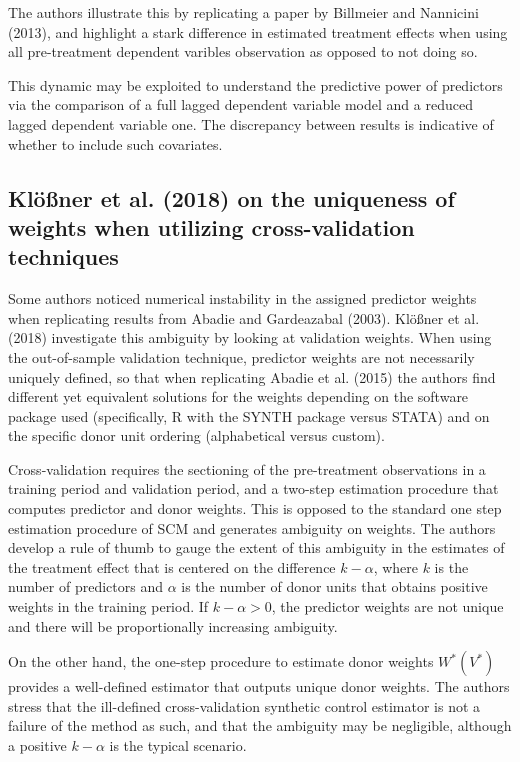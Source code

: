 \documentclass[12pt,a4paper,draft]{article}
\begin{document}
The authors illustrate this by replicating a paper by Billmeier and Nannicini (2013), 
and highlight a stark difference in estimated treatment effects when using all 
pre-treatment dependent varibles observation as opposed to not doing so.

This dynamic may be exploited to understand the predictive power of predictors via the 
comparison of a full lagged dependent variable model and a reduced lagged dependent 
variable one. The discrepancy between results is indicative of whether to include 
such covariates.




\subsection{Klößner et al. (2018) on the uniqueness of weights when utilizing cross-validation techniques}

Some authors noticed numerical instability in the assigned predictor weights 
when replicating results from Abadie and Gardeazabal (2003). 
Klößner et al. (2018) investigate this ambiguity by looking at validation weights. 
When using the out-of-sample validation technique, 
predictor weights are not necessarily uniquely defined, so that when replicating 
Abadie et al. (2015) the authors find different yet equivalent solutions 
for the weights depending on the software package used (specifically, R with 
the SYNTH package versus STATA) and on the specific donor unit ordering (alphabetical 
versus custom).

Cross-validation requires the sectioning of the pre-treatment observations 
in a training period and validation period, and a two-step estimation procedure 
that computes predictor and donor weights. This is opposed to the standard 
one step estimation procedure of SCM and generates ambiguity on weights. 
The authors develop a rule of thumb to gauge the extent of this ambiguity 
in the estimates of the treatment effect that is centered on the difference 
$k-\alpha$, where $k$ is the number of predictors and $\alpha$ is the number of 
donor units that obtains positive weights in the training period.
If $k-\alpha>0$, the predictor weights are not unique and there will be 
proportionally increasing ambiguity.

On the other hand, the one-step procedure to estimate donor weights $W^*(V^*)$ 
provides a well-defined estimator that outputs unique donor weights. The authors 
stress that the ill-defined cross-validation synthetic control estimator is not a 
failure of the method as such, and that the ambiguity may be negligible, although 
a positive $k-\alpha$ is the typical scenario.
\end{document}
